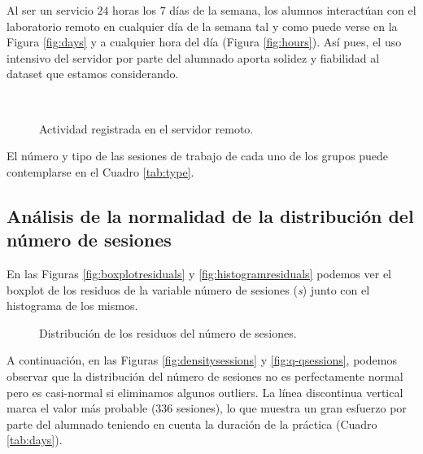 Al ser un servicio $24$ horas los $7$ días de la semana, los alumnos interactúan con el laboratorio remoto en cualquier día de la semana tal y como puede verse en la Figura \ref{fig:days} y a cualquier hora del día (Figura \ref{fig:hours}). Así pues, el uso intensivo del servidor por parte del alumnado aporta solidez y fiabilidad al dataset que estamos considerando.

\begin{figure}[H]
\centering
{}\\
\caption{Actividad registrada en el servidor remoto.}
\label{fig:activity}
\end{figure}

El número y tipo de las sesiones de trabajo de cada uno de los grupos puede contemplarse en el Cuadro \ref{tab:type}.

\subsection{Análisis de la normalidad de la distribución del número de sesiones}\label{sec:NormalityNumSessions}

En las Figuras \ref{fig:boxplotresiduals} y \ref{fig:histogramresiduals} podemos ver el boxplot de los residuos de la variable número de sesiones (\emph{s}) junto con el histograma de los mismos.

\begin{figure}[H]
\centering
{}\qquad
{}
\caption{Distribución de los residuos del número de sesiones.}
\label{fig:activity}
\end{figure}

A continuación, en las Figuras \ref{fig:densitysessions} y \ref{fig:q-qsessions}, podemos observar que la distribución del número de sesiones no es perfectamente normal pero es casi-normal si eliminamos algunos outliers. La línea discontinua vertical marca el valor más probable ($336$ sesiones), lo que muestra un gran esfuerzo por parte del alumnado teniendo en cuenta la duración de la práctica (Cuadro \ref{tab:days}).

